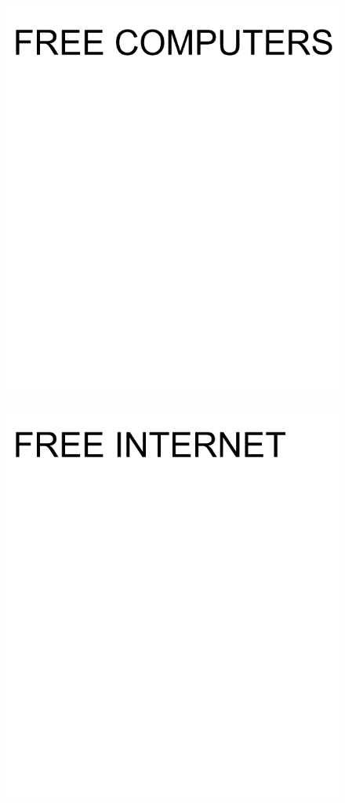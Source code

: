 \documentclass[17pt]{extreport}
\begin{document}
        \begin{figure}
		\centering
		\includegraphics[width=8.0in]{imageset/uploadimages/freecomputers.png}
	\end{figure}	
        \begin{figure}
		\centering
		\includegraphics[width=8.0in]{imageset/uploadimages/freeinternet.png}
	\end{figure}	
\end{document}
